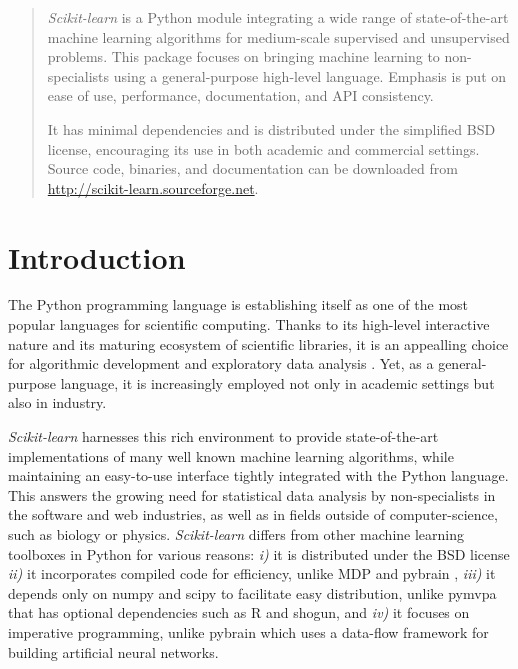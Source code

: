 \documentclass[twoside,11pt]{article}
\begin{document}

\maketitle

\begin{abstract}
%
\emph{Scikit-learn} is a Python module integrating a wide range of
state-of-the-art machine learning algorithms for medium-scale supervised
and unsupervised problems. This package focuses on bringing machine
learning to non-specialists using a general-purpose high-level language.
Emphasis is put on ease of use, performance, documentation, and API
consistency.

%
It has minimal dependencies and is distributed under the simplified BSD
license, encouraging its use in both academic and commercial settings.
Source code, binaries, and documentation can be downloaded from
\url{http://scikit-learn.sourceforge.net}.

\end{abstract}



\section{Introduction}

The Python programming language is establishing itself as one of the
most popular languages for scientific computing. Thanks to its
high-level interactive nature and its maturing ecosystem of scientific
libraries, it is an appealling choice for algorithmic development and
exploratory data analysis \citep{cise2007,cise2011}. Yet, as a
general-purpose language, it is increasingly employed not only in academic
settings but also in industry.

{\sl Scikit-learn} harnesses this rich environment to provide state-of-the-art
implementations of
many well known machine learning algorithms, while maintaining an
easy-to-use interface tightly integrated with the Python language. This answers the
growing need for statistical data analysis by non-specialists in the software and web
industries, as well as in fields outside of computer-science, such as biology or physics.
\emph{Scikit-learn} differs from other machine learning toolboxes in Python for
various reasons: \emph{i)} it is distributed under the BSD license
\emph{ii)} it incorporates compiled code for efficiency, unlike MDP
\citep{zito2008} and pybrain \citep{schaul2010}, \emph{iii)} it depends
only on numpy and scipy to facilitate easy distribution, 
unlike pymvpa \citep{hanke2009} that has optional dependencies such
as R and shogun, and \emph{iv)} it focuses on imperative
programming, unlike pybrain which uses a data-flow framework
for building artificial neural networks.
\end{document}
